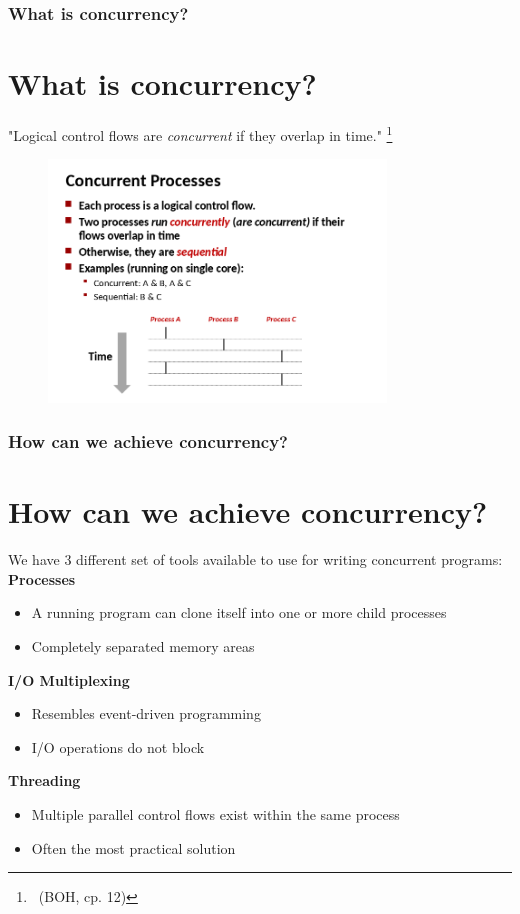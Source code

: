 \documentclass{beamer}
\begin{document}
%
%
%
\begin{frame}
\frametitle{What is concurrency?}
\section{What is concurrency?}

"Logical control flows are \textit{concurrent} if they overlap in time."
\footnote{\ (BOH, cp. 12)\vspace{2mm}}

\begin{figure}
\includegraphics[width=0.8\textwidth]{images/concurrent-processes.png}
\end{figure}
\end{frame}



%
%
%
\begin{frame}
\frametitle{How can we achieve concurrency?}
\section{How can we achieve concurrency?}
We have 3 different set of tools available to use for writing
concurrent programs:\\
\vspace{3mm}
\textbf{Processes}
\begin{itemize}
\item A running program can clone itself into one or more child processes
\item Completely separated memory areas
\end{itemize}
\vspace{2mm}

\textbf{I/O Multiplexing}
\begin{itemize}
\item Resembles event-driven programming
\item I/O operations do not block
\end{itemize}
\vspace{2mm}

\textbf{Threading}
\begin{itemize}
\item Multiple parallel control flows exist within the same process
\item Often the most practical solution
\end{itemize}
\end{frame}
\end{document}

